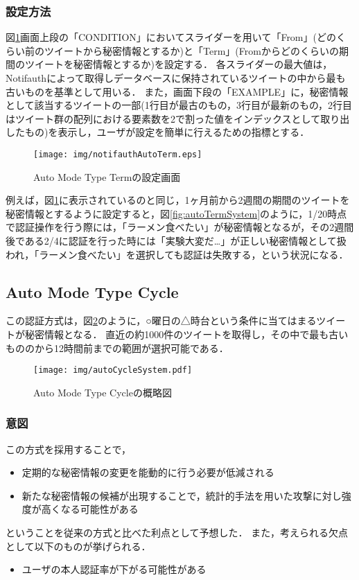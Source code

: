 \subsubsection{設定方法}
図\ref{fig:notifauthAutoTerm}画面上段の「CONDITION」においてスライダーを用いて「From」(どのくらい前のツイートから秘密情報とするか)と「Term」(Fromからどのくらいの期間のツイートを秘密情報とするか)を設定する．
各スライダーの最大値は，Notifauthによって取得しデータベースに保持されているツイートの中から最も古いものを基準として用いる．
また，画面下段の「EXAMPLE」に，秘密情報として該当するツイートの一部(1行目が最古のもの，3行目が最新のもの，2行目はツイート群の配列における要素数を2で割った値をインデックスとして取り出したもの)を表示し，ユーザが設定を簡単に行えるための指標とする．

\begin{figure}[ht]
  \begin{center}
    \texttt{[image: img/notifauthAutoTerm.eps]}
  \end{center}
  \caption{Auto Mode Type Termの設定画面}
  \label{fig:notifauthAutoTerm}
\end{figure}

例えば，図\ref{fig:notifauthAutoTerm}に表示されているのと同じ，1ヶ月前から2週間の期間のツイートを秘密情報とするように設定すると，図\ref{fig:autoTermSystem}のように，1/20時点で認証操作を行う際には，「ラーメン食べたい」が秘密情報となるが，その2週間後である2/4に認証を行った時には「実験大変だ…」が正しい秘密情報として扱われ，「ラーメン食べたい」を選択しても認証は失敗する，という状況になる．

\subsection{Auto Mode Type Cycle}
この認証方式は，図\ref{fig:autoCycleSystem}のように，○曜日の△時台という条件に当てはまるツイートが秘密情報となる．
直近の約1000件のツイートを取得し，その中で最も古いもののから12時間前までの範囲が選択可能である．

\begin{figure}[ht]
  \begin{center}
    \texttt{[image: img/autoCycleSystem.pdf]}
  \end{center}
  \caption{Auto Mode Type Cycleの概略図}
  \label{fig:autoCycleSystem}
\end{figure}

\subsubsection{意図}
この方式を採用することで，
\begin{itemize}
  \item 定期的な秘密情報の変更を能動的に行う必要が低減される
  \item 新たな秘密情報の候補が出現することで，統計的手法を用いた攻撃に対し強度が高くなる可能性がある
\end{itemize}
ということを従来の方式と比べた利点として予想した．
また，考えられる欠点として以下のものが挙げられる．
\begin{itemize}
  \item ユーザの本人認証率が下がる可能性がある
\end{itemize}

